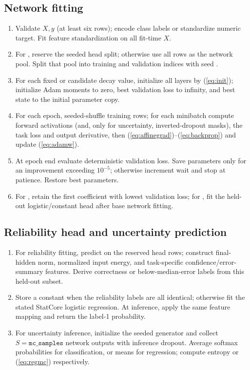 \documentclass[conference]{IEEEtran}
\begin{document}
\subsection{Network fitting}
\begin{enumerate}
\item Validate $X,y$ (at least six rows); encode class labels or standardize numeric target. Fit feature standardization on all fit-time $X$.
\item For , reserve the seeded head split; otherwise use all rows as the network pool. Split that pool into training and validation indices with seed .
\item For each fixed or candidate decay value, initialize all layers by (\ref{eq:init}); initialize Adam moments to zero, best validation loss to infinity, and best state to the initial parameter copy.
\item For each epoch, seeded-shuffle training rows; for each minibatch compute forward activations (and, only for uncertainty, inverted-dropout masks), the task loss and output derivative, then (\ref{eq:affinegrad})--(\ref{eq:backprop}) and update (\ref{eq:adamw}).
\item At epoch end evaluate deterministic validation loss. Save parameters only for an improvement exceeding $10^{-5}$; otherwise increment wait and stop at patience. Restore best parameters.
\item For , retain the first coefficient with lowest validation loss; for , fit the held-out logistic/constant head after base network fitting.
\end{enumerate}

\subsection{Reliability head and uncertainty prediction}
\begin{enumerate}
\item For reliability fitting, predict on the reserved head rows; construct final-hidden norm, normalized input energy, and task-specific confidence/error-summary features. Derive correctness or below-median-error labels from this held-out subset.
\item Store a constant when the reliability labels are all identical; otherwise fit the stated StatCore logistic regression. At inference, apply the same feature mapping and return the label-1 probability.
\item For uncertainty inference, initialize the seeded generator and collect $S=\texttt{mc\_samples}$ network outputs with inference dropout. Average softmax probabilities for classification, or means for regression; compute entropy or (\ref{eq:regmc}) respectively.
\end{enumerate}
\end{document}
